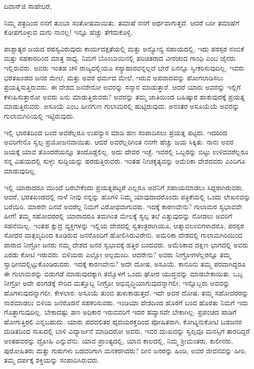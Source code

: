 \vspace{-0.5cm}

\noindent
ದಿವಾನ್‌ಜಿ ಸಾಹೇಬರೆ,

ನಿಮ್ಮ ಪತ್ರದಿಂದ ನನಗೆ ತುಂಬಾ ಸಂತೋಷವಾಯಿತು. ತಮಾಷೆ ನನಗೆ ಅರ್ಥವಾಗುತ್ತದೆ. ಆದರೆ ಬರೀ ತಮಾಷೆಗೆ ಕೋಪಗೊಳ್ಳುವ ಮಗು ನಾನಲ್ಲ! ಇನ್ನೂ ಹೆಚ್ಚು ತೆಗೆದುಕೊಳ್ಳಿ.

ಪಾಶ್ಚಾತ್ಯರ ಜಯದ ರಹಸ್ಯವಿರುವುದು ಕಾರ್ಯದಕ್ಷತೆಯಲ್ಲಿ ಮತ್ತು ಅನ್ಯೋನ್ಯ ಸಹಾಯದಲ್ಲಿ. ಇದು ಪರಸ್ಪರ ನಂಬಿಕೆ ಮತ್ತು ಸಹಕಾರದಿಂದ ಮಾತ್ರ ಸಾಧ್ಯ. ನಿಮಗೆ ಬೊಂಬಾಯಿನಲ್ಲಿ ಪರಿಚಿತರಾದ ವೀರಚಂದ ಗಾಂಧಿ ಎಂಬ ಜೈನರು ಇಲ್ಲಿರುವರು. ಅವರು ಇಂತಹ ಚಳಿ ರಾಜ್ಯದಲ್ಲಿಯೂ ಸಸ್ಯಾಹಾರವನ್ನಲ್ಲದೆ ಬೇರೆ ಏನನ್ನೂ ಸ್ವೀಕರಿಸುವುದಿಲ್ಲ. ಇವರು ಭರತಖಂಡದ ಜನರ ಮೇಲೆ, ಮತ್ತು ಅವರ ಧರ್ಮದ ಮೇಲೆ, ಇರುವ ಅಪವಾದವನ್ನು ಹೋಗಲಾಡಿಸಲು ಪ್ರಯತ್ನಿಸುತ್ತಿರುವರು. ಈ ದೇಶದ ಜನರೇನೋ ಅವರನ್ನು ಸನ್ಮಾನ ಮಾಡುತ್ತಾರೆ. ಆದರೆ ಯಾರು ಅವರನ್ನು ಇಲ್ಲಿಗೆ ಕಳುಹಿಸುತ್ತಾರೋ ಅವರು ಏನು ಮಾಡುತ್ತಿರುವರು? ಅವರನ್ನು ತಮ್ಮ ಜಾತಿಯಿಂದ ಬಹಿಷ್ಕಾರ ಹಾಕುವುದಕ್ಕೆ ಪ್ರಯತ್ನ ಮಾಡುತ್ತಿರುವರು. ಅಸೂಯೆ ಎಂಬ ಹೀನಗುಣ ಗುಲಾಮರಲ್ಲಿ ಹುಟ್ಟಿರುವುದು. ಅನಂತರ ಅಸೂಯೆಯೆ ಅವರನ್ನು ಗುಲಾಮಗಿರಿಯಲ್ಲಿ ಇಟ್ಟಿರುವುದು.

ಇಲ್ಲಿ ಭಾರತದಿಂದ ಬಂದ ಅವರೆಲ್ಲರೂ ಉಪನ್ಯಾಸ ಮಾಡಿ ಹಣ ಸಂಪಾದಿಸಲು ಪ್ರಯತ್ನ ಪಟ್ಟರು. ಇದರಿಂದ ಅವರಿಗೇನೊ ಸ್ವಲ್ಪ ಪ್ರಯೋಜನವಾಯಿತು. ಆದರೆ ಅವರೆಲ್ಲರಿಗಿಂತ ನನಗೇ ಹೆಚ್ಚು ಜಯ ಸಿಕ್ಕಿತು. ನಾನು ಅವರ ಜಯಕ್ಕೆ ಯಾವ ತೊಂದರೆಯನ್ನೂ ತಂದೊಡ್ಡಲಿಲ್ಲ. ಅದು ದೇವರ ಇಚ್ಛೆ. ಇವರಲ್ಲಿ ಒಬ್ಬರನ್ನು ಬಿಟ್ಟು ಉಳಿದವರೆಲ್ಲರೂ ನನ್ನ ವಿಷಯದಲ್ಲಿ ಸುಳ್ಳು ಸುದ್ದಿಯನ್ನು ಹರಡುತ್ತಿರುವರು. ಇಂತಹ ನೀಚಕೃತ್ಯವನ್ನು ಅಮೆರಿಕಾ ದೇಶದವರು ಎಂದಿಗೂ ಮಾಡುವುದಿಲ್ಲ.

ಇಲ್ಲಿ ಯಾರಾದರೂ ಮುಂದೆ ಬರಬೇಕೆಂದು ಪ್ರಯತ್ನಪಟ್ಟರೆ ಎಲ್ಲರೂ ಅವನಿಗೆ ಸಹಾಯಮಾಡಲು ಸಿದ್ದರಾಗಿರುವರು. ಆದರೆ, ಭರತಖಂಡದಲ್ಲಿ ನಾಳೆ ನೀವು ನನ್ನನ್ನು ಹೊಗಳಿ ನಿಮ್ಮ ಯಾವುದಾದರೊಂದು ಪತ್ರಿಕೆಯಲ್ಲಿ ಒಂದು ಲೇಖನವನ್ನು ಬರೆಯಿರಿ. ಮಾರನೇ ದಿನವೆ ಅವರೆಲ್ಲ ನಿಮಗೆ ವಿರೋಧವಾಗುವರು. ಇದಕ್ಕೆ ಕಾರಣವೇನು? ಗುಲಾ\break ಮರ ಸ್ವಭಾವವೇ ಹೀಗೆ! ತಮ್ಮ ಸಹೋದರರಲ್ಲಿ ಯಾರಾದರೂ ತಮಗಿಂತ ಮೇಲಕ್ಕೆ ಸ್ವಲ್ಪ ತಲೆ ಎತ್ತುವುದನ್ನು ನೋಡಲು ಅವರಿಗೆ ಸಹನೆಯಿಲ್ಲ. ಇಂತಹ ಕ್ಷುದ್ರ ವ್ಯಕ್ತಿಗಳನ್ನು ಇಲ್ಲಿಯ ದೇಶದಲ್ಲಿ ಸ್ವತಂತ್ರರಾಗಿಯೂ, ಆತ್ಮಾವಲಂಬಿಗಳಾದರೂ, ಪರಸ್ಪರ ಸೋದರ ವಾತ್ಸಲ್ಯದಿಂದ ಕೂಡಿರುವ ಜನರೊಂದಿಗೆ ಹೋಲಿಸಿರುವಿರೇನು. ಅಮೆರಿಕಾ ದೇಶದಲ್ಲಿ ಗುಲಾಮಗಿರಿಯಿಂದ ಪಾರಾದ ನೀಗ್ರೋ ಜನರು ನಮ್ಮ ದೇಶದ ಜನರ ಸ್ವಭಾವಕ್ಕೆ ಹತ್ತಿರ ಬಂದವರು. ಅಮೆರಿಕಾದ ದಕ್ಷಿಣ ಭಾಗದಲ್ಲಿ ಅವರು ಎರಡು ಕೋಟಿ ಇರುವರು. ಬಿಳಿಯರು ಎಲ್ಲೋ ಅಲ್ಪಮಂದಿ. ಆದರೇನು? ಅವರು ನೀಗ್ರೋಗಳೆಲ್ಲರನ್ನೂ ತಮ್ಮ ಸ್ವಾಧೀನದಲ್ಲಿಟ್ಟುಕೊಂಡಿರುವರು. ಇದಕ್ಕೆ ಕಾರಣವೇನು? ಅದೇ ದೋಷ, ಅಸೂಯೆ. ಕಾನೂನು ತಮ್ಮ ಪರವಾಗಿದ್ದರೂ ಈ ಗುಲಾಮರನ್ನು ಬಿಡುಗಡೆ ಮಾಡುವುದಕ್ಕಾಗಿ ತಮ್ಮೊಳಗೆ ಒಂದು ಘೋರ ಯುದ್ಧವನ್ನು ಮಾಡಬೇಕಾಯಿತು. ಒಬ್ಬ ನೀಗ್ರೋ ಅದೇ ಪಂಗಡಕ್ಕೆ ಸೇರಿದ ಮತ್ತೊಬ್ಬ ನೀಗ್ರೋ ಅಭಿವೃದ್ಧಿಯಾಗುವುದನ್ನಾಗಲೀ, ಇನ್ನೊಬ್ಬರು ಅವನನ್ನು ಹೊಗಳುವುದನ್ನಾಗಲೀ, ಕೇಳಲಾರ. ಅಸೂಯೆ ತುಂಬಿ ತುಳುಕಾಡುತ್ತದೆ. ಇದೇ ಅವರ ದೋಷ. ತಮ್ಮ ಸಹೋದರರನ್ನು ನಾಶಮಾಡಲು ಬಿಳಿಯ ಜನರೊಡನೆ ಸಹಕರಿಸುವರು. ಇಂಡಿಯಾ ದೇಶದಿಂದ ಹೊರಗೆ ಬಂದ ಹೊರತು ನಿಮಗೆ ಇದು ಗೊತ್ತಾಗುವುದಿಲ್ಲ. ಬೇಕಾದಷ್ಟು ಹಣ ಅಧಿಕಾರ ಇರುವವರಿಗೆ ಇದರ ಹವ್ಯಾಸವೇ ಬೇಕಾಗಿಲ್ಲ. ಪ್ರಪಂಚದ ಪಾಡಿಗೆ ಹೋಗುತ್ತಿರಲಿ ಎನ್ನಬಹುದು. ಯಾರು ಪದದಲಿತರ ಹೃದಯರಕ್ತದಿಂದ ಪೋಷಿತರಾಗಿ, ಕೋಟ್ಯನುಕೋಟಿ ಬಡಜನರ ದುಡಿತದಿಂದ ಸುಖದಲ್ಲಿ ಬಾಳಿ ವಿದ್ಯಾರ್ಜನೆ ಮಾಡಿದರೋ ಅವರು, ಇವರ ದುಃಖವನ್ನು ಸ್ವಲ್ಪವೂ ಮನಸ್ಸಿಗೆ ತಾರದಿದ್ದರೆ ಅಂತಹವರನ್ನು ದ್ರೋಹಿ ಎನ್ನುವೆನು. ಯಾವ ಪ್ರಾಂತ್ಯದಲ್ಲಿ, ಯಾವ ಕಾಲದಲ್ಲಿ, ನಿಮ್ಮ ಶ‍್ರೀಮಂತರು, ಕುಲೀನರು, ಪುರೋಹಿತರು ಮತ್ತು ಗುರುಗಳು ಬಡವರಿಗಾಗಿ ಮನಕರಗಿದರು? ದೀನ ಜನರನ್ನು ಹಿಂಡಿ, ಅವರ ಜೀವನವನ್ನು ಹೀರಿ, ತಮ್ಮ ದರ್ಪಕ್ಕೆ ಶಕ್ತಿಯನ್ನು ಸಂಪಾದಿಸಿರುವರು.

